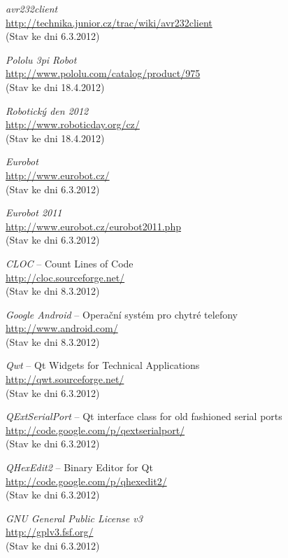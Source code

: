 \documentclass[12pt, a4paper, oneside]{article}
\newcommand{\It}{\textit}  %
\begin{document}
\begin{thebibliography}{99}
     \It{avr232client} \\
    \url{http://technika.junior.cz/trac/wiki/avr232client}\\
    (Stav ke dni 6.3.2012)

     \It{Pololu 3pi Robot} \\
    \url{http://www.pololu.com/catalog/product/975}\\
    (Stav ke dni 18.4.2012)

     \It{Robotický den 2012} \\
    \url{http://www.roboticday.org/cz/}\\
    (Stav ke dni 18.4.2012)

     \It{Eurobot} \\
    \url{http://www.eurobot.cz/}\\
    (Stav ke dni 6.3.2012)

     \It{Eurobot 2011} \\
    \url{http://www.eurobot.cz/eurobot2011.php}\\
    (Stav ke dni 6.3.2012)

     \It{CLOC} -- Count Lines of Code \\
    \url{http://cloc.sourceforge.net/}\\
    (Stav ke dni 8.3.2012)

     \It{Google Android} -- Operační systém pro chytré telefony\\
    \url{http://www.android.com/}\\
    (Stav ke dni 8.3.2012)

     \It{Qwt} -- Qt Widgets for Technical Applications \\
    \url{http://qwt.sourceforge.net/}\\
    (Stav ke dni 6.3.2012)

     \It{QExtSerialPort} -- Qt interface class for old fashioned serial ports \\
    \url{http://code.google.com/p/qextserialport/}\\
    (Stav ke dni 6.3.2012)

     \It{QHexEdit2} -- Binary Editor for Qt \\
    \url{http://code.google.com/p/qhexedit2/}\\
    (Stav ke dni 6.3.2012)

     \It{GNU General Public License v3} \\
    \url{http://gplv3.fsf.org/}\\
    (Stav ke dni 6.3.2012)


\end{thebibliography}
\end{document}
